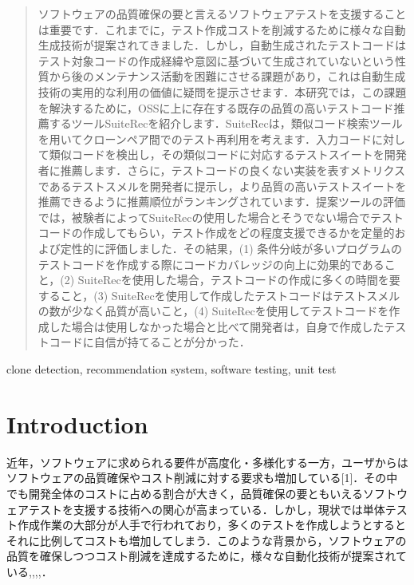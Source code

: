 \documentclass[conference]{IEEEtran}
\begin{document}
\begin{abstract}
ソフトウェアの品質確保の要と言えるソフトウェアテストを支援することは重要です．これまでに，テスト作成コストを削減するために様々な自動生成技術が提案されてきました．しかし，自動生成されたテストコードはテスト対象コードの作成経緯や意図に基づいて生成されていないという性質から後のメンテナンス活動を困難にさせる課題があり，これは自動生成技術の実用的な利用の価値に疑問を提示させます．本研究では，この課題を解決するために，OSSに上に存在する既存の品質の高いテストコード推薦するツールSuiteRecを紹介します．SuiteRecは，類似コード検索ツールを用いてクローンペア間でのテスト再利用を考えます．入力コードに対して類似コードを検出し，その類似コードに対応するテストスイートを開発者に推薦します．さらに，テストコードの良くない実装を表すメトリクスであるテストスメルを開発者に提示し，より品質の高いテストスイートを推薦できるように推薦順位がランキングされています．提案ツールの評価では，被験者によってSuiteRecの使用した場合とそうでない場合でテストコードの作成してもらい，テスト作成をどの程度支援できるかを定量的および定性的に評価しました．その結果，(1) 条件分岐が多いプログラムのテストコードを作成する際にコードカバレッジの向上に効果的であること，(2) SuiteRecを使用した場合，テストコードの作成に多くの時間を要すること，(3) SuiteRecを使用して作成したテストコードはテストスメルの数が少なく品質が高いこと，(4) SuiteRecを使用してテストコードを作成した場合は使用しなかった場合と比べて開発者は，自身で作成したテストコードに自信が持てることが分かった．

\end{abstract}

\begin{IEEEkeywords}
 clone detection, recommendation system, software testing, unit test 
\end{IEEEkeywords}

\section{Introduction}
近年，ソフトウェアに求められる要件が高度化・多様化する一方，ユーザからはソフトウェアの品質確保やコスト削減に対する要求も増加している[1]．その中でも開発全体のコストに占める割合が大きく，品質確保の要ともいえるソフトウェアテストを支援する技術への関心が高まっている\cite{b20}．しかし，現状では単体テスト作成作業の大部分が人手で行われており，多くのテストを作成しようとするとそれに比例してコストも増加してしまう．このような背景から，ソフトウェアの品質を確保しつつコスト削減を達成するために，様々な自動化技術が提案されている\cite{b3},\cite{b16},\cite{b17},\cite{b18},\cite{b19}．
\end{document}
